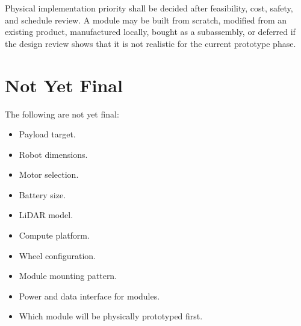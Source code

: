 Physical implementation priority shall be decided after feasibility, cost, safety, and schedule review. A module may be built from scratch, modified from an existing product, manufactured locally, bought as a subassembly, or deferred if the design review shows that it is not realistic for the current prototype phase.

\section{Not Yet Final}

The following are not yet final:

\begin{itemize}
    \item Payload target.
    \item Robot dimensions.
    \item Motor selection.
    \item Battery size.
    \item LiDAR model.
    \item Compute platform.
    \item Wheel configuration.
    \item Module mounting pattern.
    \item Power and data interface for modules.
    \item Which module will be physically prototyped first.
\end{itemize}
